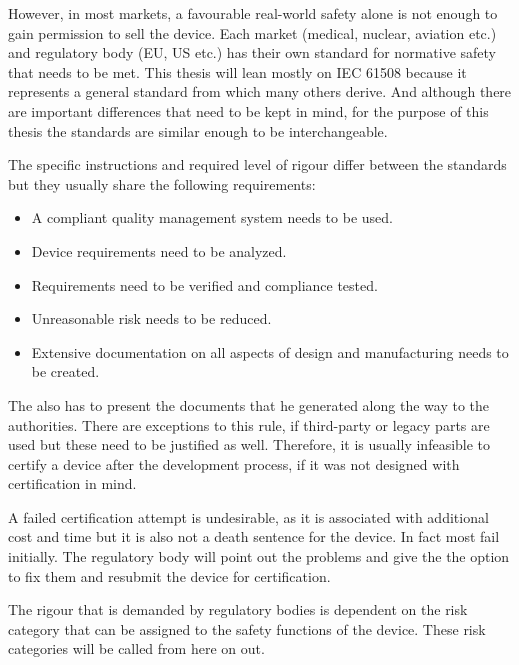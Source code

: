 However, in most markets, a favourable real-world safety alone is not enough to gain permission to sell the device.  Each market (medical, nuclear, aviation etc.) and regulatory body (EU, US etc.) has their own standard for normative safety that needs to be met. This thesis will lean mostly on IEC 61508 \cite{IEC.2010-1}\cite{IEC.2010-2}\cite{IEC.2010-3} because it represents a general standard from which many others derive. And although there are important differences that need to be kept in mind, for the purpose of this thesis the standards are similar
enough to be interchangeable. 

The specific instructions and required level of rigour differ between the standards but they usually share the following requirements:

\begin{itemize}
\item A compliant quality management system needs to be used.
\item Device requirements need to be analyzed.
\item Requirements need to be verified and compliance tested.
\item Unreasonable risk needs to be reduced.
\item Extensive documentation on all aspects of design and manufacturing needs to be created.
\end{itemize}

The \mfg{} also has to present the documents that he generated along the way to the authorities. There are exceptions to this rule, if third-party or legacy parts are used but these need to be justified as well. Therefore, it is usually infeasible to certify a device after the development process, if it was not designed with certification in mind. 

A failed certification attempt is undesirable, as it is associated with additional cost and time but it is also not a death sentence for the device. In fact most fail initially. The regulatory body will point out the problems and give the \mfg{} the option to fix them and resubmit the device for certification.

The rigour that is demanded by regulatory bodies is dependent on the risk category that can be assigned to the safety functions of the device. These risk categories will be called  from here on out. 

